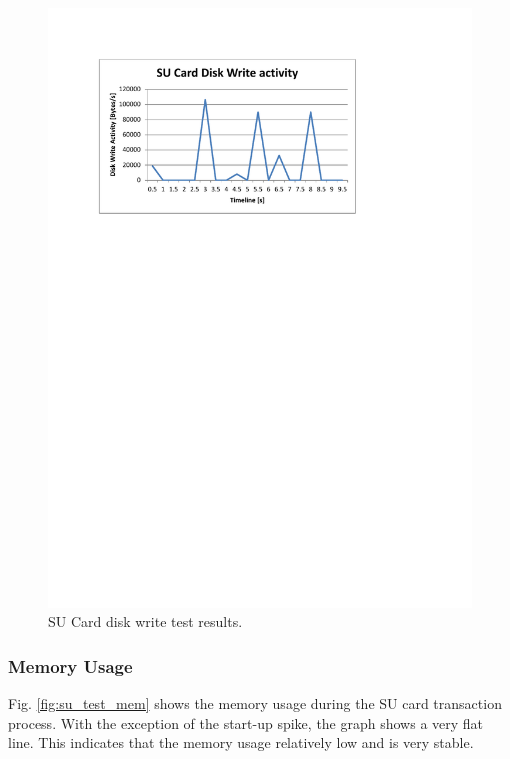 \begin{figure}
 \centering 
 \includegraphics[clip=true, trim = 0 550 80 70,
 scale=0.7]{su_test_disk}
 \caption{SU Card disk write test results.}
 \label{fig:su_test_disk}
\end{figure}

\subsubsection{Memory Usage}

Fig. \ref{fig:su_test_mem} shows the memory usage during the SU card transaction
process. With the exception of the start-up spike, the graph shows a very flat
line. This indicates that the memory usage relatively low and is very stable. 

